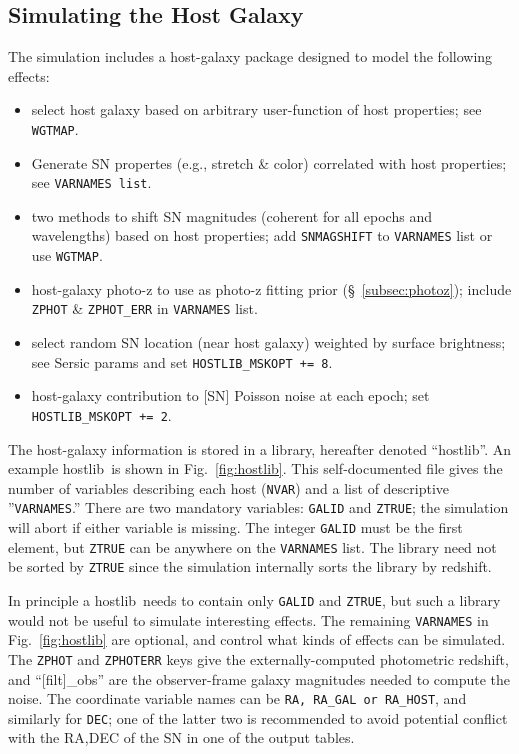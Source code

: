 \documentclass[12pt]{article}
\newcommand{\hostlib}{{\sc hostlib}}
\begin{document}
{%
\clearpage
\subsection{Simulating the Host Galaxy}
\label{subsec:hostlib}

The simulation includes a host-galaxy
package designed to model the following effects:
\begin{itemize}
%
  \item select host galaxy based on arbitrary user-function
        of host properties; see {\tt WGTMAP}.
%
  \item Generate SN propertes (e.g., stretch \& color) correlated
        with host properties; see {\tt VARNAMES list}.
%
  \item two methods to shift SN magnitudes 
        (coherent for all epochs and wavelengths) 
        based on host properties;
	add {\tt SNMAGSHIFT} to  {\tt VARNAMES} list or use {\tt WGTMAP}.
%
  \item host-galaxy photo-z to use as photo-z fitting prior 
    (\S~\ref{subsec:photoz});
    include {\tt ZPHOT} \& {\tt ZPHOT\_ERR} in {\tt VARNAMES} list.	
%
  \item select random SN location (near host galaxy)
    weighted by surface brightness; see Sersic params
    and set {\tt HOSTLIB\_MSKOPT += 8}.
%
  \item host-galaxy contribution to [SN] Poisson noise at each epoch;
    set {\tt HOSTLIB\_MSKOPT += 2}.
%
\end{itemize} 

The host-galaxy information is stored in a library,
hereafter denoted ``{\hostlib}''. An example \hostlib\
is shown in Fig.~\ref{fig:hostlib}.
This self-documented file gives the number of variables
describing each host ({\tt NVAR}) and a list of 
descriptive ''{\tt VARNAMES}.''  There are two mandatory
variables: {\tt GALID} and  {\tt ZTRUE}; the simulation
will abort if either variable is missing. 
The integer {\tt GALID} must be the first element,
but {\tt ZTRUE} can be anywhere on the {\tt VARNAMES} list.
The library need not be sorted by {\tt ZTRUE} since
the simulation internally sorts the library by redshift.

In principle a \hostlib\ needs to contain only
{\tt GALID} and {\tt ZTRUE}, but such a library would
not be useful to simulate interesting effects.
The remaining {\tt VARNAMES} in Fig.~\ref{fig:hostlib}
are optional, and control what kinds of effects can
be simulated.  The {\tt ZPHOT} and {\tt ZPHOTERR} keys
give the externally-computed photometric redshift,
and ``[filt]\_obs'' are the observer-frame galaxy
magnitudes needed to compute the noise.
The coordinate variable names can be {\tt RA, RA\_GAL or RA\_HOST},
and similarly for {\tt DEC}; one of the latter two is recommended
to avoid potential conflict with the RA,DEC of the SN in one of the
output tables.

}
\end{document}
